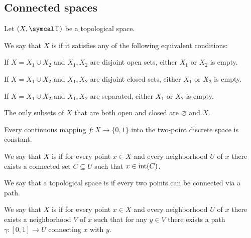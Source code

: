 \subsection{Connected spaces}\label{subsec:connected_sets}

Let \( (X, \T) \) be a topological space.

\begin{definition}\label{def:connected_space}\cite[theorem 6.1.1]{Engelking1989}
  We say that \( X \) is  if it satisfies any of the following equivalent conditions:
  \begin{defenum}
     If \( X = X_1 \cup X_2 \) and \( X_1, X_2 \) are disjoint open sets, either \( X_1 \) or \( X_2 \) is empty.

     If \( X = X_1 \cup X_2 \) and \( X_1, X_2 \) are disjoint closed sets, either \( X_1 \) or \( X_2 \) is empty.

     If \( X = X_1 \cup X_2 \) and \( X_1, X_2 \) are separated, either \( X_1 \) or \( X_2 \) is empty.

     The only subsets of \( X \) that are both open and closed are \( \varnothing \) and \( X \).

     Every continuous mapping \( f: X \to \{ 0, 1 \} \) into the two-point discrete space is constant.
  \end{defenum}
\end{definition}

\begin{definition}\label{def:locally_connected}\cite[exercise 6.3.3]{Engelking1989}
  We say that \( X \) is  if for every point \( x \in X \) and every neighborhood \( U \) of \( x \) there exists a connected set \( C \subseteq U \) such that \( x \in \operatorname{int}(C) \).
\end{definition}

\begin{definition}\label{def:path_connected}\cite[exercise 6.3.9]{Engelking1989}
  We say that a topological space is  if every two points can be connected via a path.
\end{definition}

\begin{definition}\label{def:locally_path_connected}\cite[exercise 6.3.10]{Engelking1989}
  We say that \( X \) is  if for every point \( x \in X \) and every neighborhood \( U \) of \( x \) there exists a neighborhood \( V \) of \( x \) such that for any \( y \in V \) there exists a path \( \gamma: [0, 1] \to U \) connecting \( x \) with \( y \).
\end{definition}

